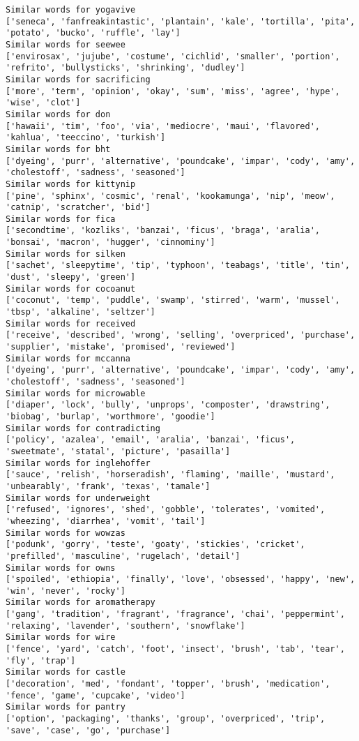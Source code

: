 \documentclass[11pt]{article}
\begin{document}
\begin{Verbatim}[commandchars=\\\{\}]
Similar words for yogavive
['seneca', 'fanfreakintastic', 'plantain', 'kale', 'tortilla', 'pita', 'potato', 'bucko', 'ruffle', 'lay']
Similar words for seewee
['envirosax', 'jujube', 'costume', 'cichlid', 'smaller', 'portion', 'refrito', 'bullysticks', 'shrinking', 'dudley']
Similar words for sacrificing
['more', 'term', 'opinion', 'okay', 'sum', 'miss', 'agree', 'hype', 'wise', 'clot']
Similar words for don
['hawaii', 'tim', 'foo', 'via', 'mediocre', 'maui', 'flavored', 'kahlua', 'teeccino', 'turkish']
Similar words for bht
['dyeing', 'purr', 'alternative', 'poundcake', 'impar', 'cody', 'amy', 'cholestoff', 'sadness', 'seasoned']
Similar words for kittynip
['pine', 'sphinx', 'cosmic', 'renal', 'kookamunga', 'nip', 'meow', 'catnip', 'scratcher', 'bid']
Similar words for fica
['secondtime', 'kozliks', 'banzai', 'ficus', 'braga', 'aralia', 'bonsai', 'macron', 'hugger', 'cinnominy']
Similar words for silken
['sachet', 'sleepytime', 'tip', 'typhoon', 'teabags', 'title', 'tin', 'dust', 'sleepy', 'green']
Similar words for cocoanut
['coconut', 'temp', 'puddle', 'swamp', 'stirred', 'warm', 'mussel', 'tbsp', 'alkaline', 'seltzer']
Similar words for received
['receive', 'described', 'wrong', 'selling', 'overpriced', 'purchase', 'supplier', 'mistake', 'promised', 'reviewed']
Similar words for mccanna
['dyeing', 'purr', 'alternative', 'poundcake', 'impar', 'cody', 'amy', 'cholestoff', 'sadness', 'seasoned']
Similar words for microwable
['diaper', 'lock', 'bully', 'unprops', 'composter', 'drawstring', 'biobag', 'burlap', 'worthmore', 'goodie']
Similar words for contradicting
['policy', 'azalea', 'email', 'aralia', 'banzai', 'ficus', 'sweetmate', 'statal', 'picture', 'pasailla']
Similar words for inglehoffer
['sauce', 'relish', 'horseradish', 'flaming', 'maille', 'mustard', 'unbearably', 'frank', 'texas', 'tamale']
Similar words for underweight
['refused', 'ignores', 'shed', 'gobble', 'tolerates', 'vomited', 'wheezing', 'diarrhea', 'vomit', 'tail']
Similar words for wowzas
['podunk', 'gorry', 'teste', 'goaty', 'stickies', 'cricket', 'prefilled', 'masculine', 'rugelach', 'detail']
Similar words for owns
['spoiled', 'ethiopia', 'finally', 'love', 'obsessed', 'happy', 'new', 'win', 'never', 'rocky']
Similar words for aromatherapy
['gang', 'tradition', 'fragrant', 'fragrance', 'chai', 'peppermint', 'relaxing', 'lavender', 'southern', 'snowflake']
Similar words for wire
['fence', 'yard', 'catch', 'foot', 'insect', 'brush', 'tab', 'tear', 'fly', 'trap']
Similar words for castle
['decoration', 'med', 'fondant', 'topper', 'brush', 'medication', 'fence', 'game', 'cupcake', 'video']
Similar words for pantry
['option', 'packaging', 'thanks', 'group', 'overpriced', 'trip', 'save', 'case', 'go', 'purchase']

    \end{Verbatim}


    
    
    
    
\end{document}
